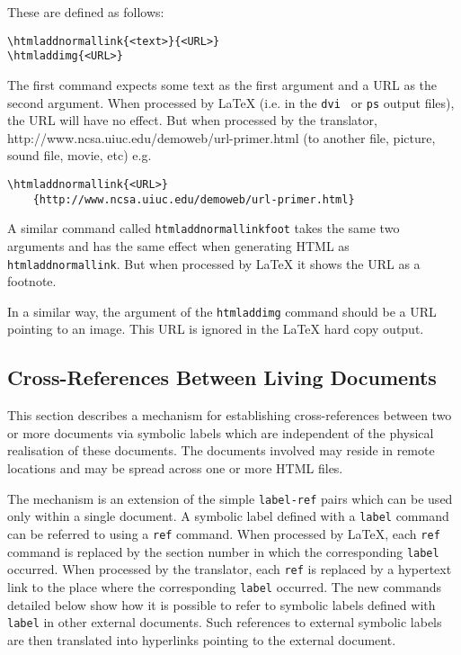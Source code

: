 These are defined as follows:
\begin{verbatim}
\htmladdnormallink{<text>}{<URL>}
\htmladdimg{<URL>}
\end{verbatim}
The first command expects some text as the first argument and a URL as
the second argument. When processed by LaTeX (i.e. in the {\tt dvi }
or {\tt ps} output files), the URL will have no effect.
But when processed by the 
translator, 
{http://www.ncsa.uiuc.edu/demoweb/url-primer.html} (to another
file, picture, sound file, movie, etc) e.g.
\begin{verbatim}
\htmladdnormallink{<URL>}
	{http://www.ncsa.uiuc.edu/demoweb/url-primer.html}
\end{verbatim}

A similar command called {\tt htmladdnormallinkfoot} 
takes the same two arguments and has the same effect when generating
HTML as {\tt htmladdnormallink}. But when processed by LaTeX it shows
the 
URL as a footnote.

In a similar way, the argument of the {\tt htmladdimg} command 
should be a URL pointing
to an image. This URL is ignored in
the LaTeX hard copy output. 

\subsection{Cross-References Between Living Documents}
\label{external}
This section describes a mechanism for establishing cross-references
between two or more
documents via symbolic labels which are independent of
the physical realisation of these documents. 
The documents involved may reside in remote locations
and may be spread across one or more HTML files. 

The mechanism
is an extension of the simple {\tt label-ref} pairs which can be used only 
within a single document. A symbolic label defined with a 
{\tt label} command can be referred to using a {\tt ref} command.
When processed by LaTeX, each {\tt ref} command is replaced by the 
section number in which the corresponding {\tt label} occurred.
When processed by the translator, each {\tt ref} is replaced by 
a hypertext link to the place where the corresponding {\tt label}
occurred. The new commands detailed below show how it is possible to
refer to symbolic labels defined with {\tt label} in other external
documents.
Such references to external symbolic labels are then translated
into hyperlinks pointing to the external document.

